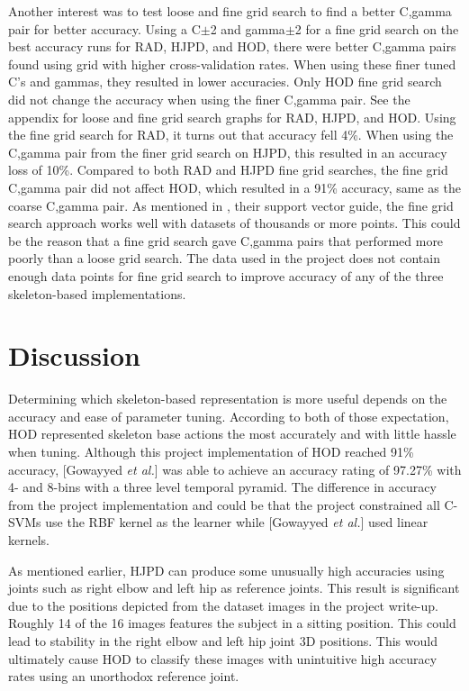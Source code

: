 \documentclass[11pt,nocopyrightspace]{config}
\begin{document}
Another interest was to test loose and fine grid search to find a better C,gamma pair for better accuracy. Using a C$\pm$2 and gamma$\pm$2 for a fine grid search on the best accuracy runs for RAD, HJPD, and HOD, there were better C,gamma pairs found using grid with higher cross-validation rates. When using these finer tuned C's and gammas, they resulted in lower accuracies. Only HOD fine grid search did not change the accuracy when using the finer C,gamma pair. See the appendix for loose and fine grid search graphs for RAD, HJPD, and HOD. Using the fine grid search for RAD, it turns out that accuracy fell 4\%. When using the C,gamma pair from the finer grid search on HJPD, this resulted in an accuracy loss of 10\%. Compared to both RAD and HJPD fine grid searches, the fine grid C,gamma pair did not affect HOD, which resulted in a 91\% accuracy, same as the coarse C,gamma pair. As mentioned in \cite{guide}, their support vector guide, the fine grid search approach works well with datasets of thousands or more points. This could be the reason that a fine grid search gave C,gamma pairs that performed more poorly than a loose grid search. The data used in the project does not contain enough data points for fine grid search to improve accuracy of any of the three skeleton-based implementations.

\section{Discussion}

Determining which skeleton-based representation is more useful depends on the accuracy and ease of parameter tuning. According to both of those expectation, HOD represented skeleton base actions the most accurately and with little hassle when tuning. Although this project implementation of HOD reached 91\% accuracy, [Gowayyed \textit{et al.}] was able to achieve an accuracy rating of 97.27\% with 4- and 8-bins with a three level temporal pyramid. The difference in accuracy from the project implementation and \cite{hodPaper} could be that the project constrained all C-SVMs use the RBF kernel as the learner while [Gowayyed \textit{et al.}] used linear kernels.

As mentioned earlier, HJPD can produce some unusually high accuracies using joints such as right elbow and left hip as reference joints. This result is significant due to the positions depicted from the dataset images in the project write-up. Roughly 14 of the 16 images features the subject in a sitting position. This could lead to stability in the right elbow and left hip joint 3D positions. This would ultimately cause HOD to classify these images with unintuitive high accuracy rates using an unorthodox reference joint.
\end{document}
